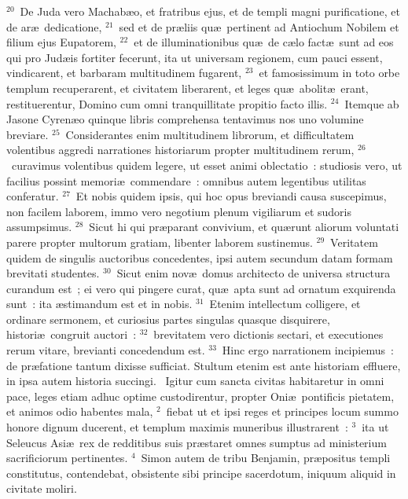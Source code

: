 ${}^{20}$~De Juda vero Machab\ae o, et fratribus ejus, et de templi magni purificatione, et de ar\ae\ dedicatione,
${}^{21}$~sed et de pr\ae liis qu\ae\ pertinent ad Antiochum Nobilem et filium ejus Eupatorem,
${}^{22}$~et de illuminationibus qu\ae\ de c\ae lo fact\ae\ sunt ad eos qui pro Jud\ae is fortiter fecerunt, ita ut universam regionem, cum pauci essent, vindicarent, et barbaram multitudinem fugarent,
${}^{23}$~et famosissimum in toto orbe templum recuperarent, et civitatem liberarent, et leges qu\ae\ abolit\ae\ erant, restituerentur, Domino cum omni tranquillitate propitio facto illis.
${}^{24}$~Itemque ab Jasone Cyren\ae o quinque libris comprehensa tentavimus nos uno volumine breviare.
${}^{25}$~Considerantes enim multitudinem librorum, et difficultatem volentibus aggredi narrationes historiarum propter multitudinem rerum,
${}^{26}$~curavimus volentibus quidem legere, ut esset animi oblectatio~: studiosis vero, ut facilius possint memori\ae\ commendare~: omnibus autem legentibus utilitas conferatur.
${}^{27}$~Et nobis quidem ipsis, qui hoc opus breviandi causa suscepimus, non facilem laborem, immo vero negotium plenum vigiliarum et sudoris assumpsimus.
${}^{28}$~Sicut hi qui pr\ae parant convivium, et qu\ae runt aliorum voluntati parere propter multorum gratiam, libenter laborem sustinemus.
${}^{29}$~Veritatem quidem de singulis auctoribus concedentes, ipsi autem secundum datam formam brevitati studentes.
${}^{30}$~Sicut enim nov\ae\ domus architecto de universa structura curandum est~; ei vero qui pingere curat, qu\ae\ apta sunt ad ornatum exquirenda sunt~: ita \ae stimandum est et in nobis.
${}^{31}$~Etenim intellectum colligere, et ordinare sermonem, et curiosius partes singulas quasque disquirere, histori\ae\ congruit auctori~:
${}^{32}$~brevitatem vero dictionis sectari, et executiones rerum vitare, brevianti concedendum est.
${}^{33}$~Hinc ergo narrationem incipiemus~: de pr\ae fatione tantum dixisse sufficiat. Stultum etenim est ante historiam effluere, in ipsa autem historia succingi.
~Igitur cum sancta civitas habitaretur in omni pace, leges etiam adhuc optime custodirentur, propter Oni\ae\ pontificis pietatem, et animos odio habentes mala,
${}^{2}$~fiebat ut et ipsi reges et principes locum summo honore dignum ducerent, et templum maximis muneribus illustrarent~:
${}^{3}$~ita ut Seleucus Asi\ae\ rex de redditibus suis pr\ae staret omnes sumptus ad ministerium sacrificiorum pertinentes.
${}^{4}$~Simon autem de tribu Benjamin, pr\ae positus templi constitutus, contendebat, obsistente sibi principe sacerdotum, iniquum aliquid in civitate moliri.
